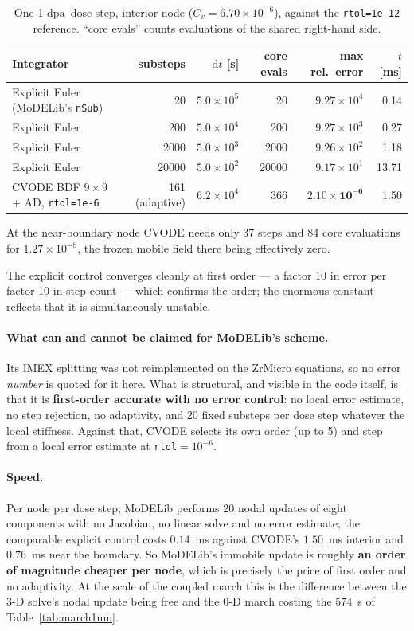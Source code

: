 \documentclass[11pt,a4paper]{article}
\newcommand{\code}[1]{\texttt{\small #1}}
\newcommand{\dpa}{\ensuremath{\mathrm{dpa}}}
\begin{document}
\begin{table}[htb]
\centering
\caption{One 1 \dpa\ dose step, interior node ($C_v=6.70\times10^{-6}$), against
the \code{rtol=1e-12} reference. ``core evals'' counts evaluations of the shared
right-hand side.}
\label{tab:eulerbdf}
\begin{tabular}{lrrrrr}
\toprule
Integrator & substeps & $\mathrm dt$ [s] & core evals & max rel.\ error & $t$ [ms] \\
\midrule
Explicit Euler (MoDELib's \code{nSub}) & 20    & $5.0\times10^{5}$ & 20    & $9.27\times10^{4}$ & 0.14 \\
Explicit Euler                          & 200   & $5.0\times10^{4}$ & 200   & $9.27\times10^{3}$ & 0.27 \\
Explicit Euler                          & 2000  & $5.0\times10^{3}$ & 2000  & $9.26\times10^{2}$ & 1.18 \\
Explicit Euler                          & 20000 & $5.0\times10^{2}$ & 20000 & $9.17\times10^{1}$ & 13.71 \\
\midrule
CVODE BDF $9\times9$ + AD, \code{rtol=1e-6} & 161 (adaptive) & $6.2\times10^{4}$ & 366 & $\mathbf{2.10\times10^{-6}}$ & 1.50 \\
\bottomrule
\end{tabular}
\end{table}

At the near-boundary node CVODE needs only 37 steps and 84 core evaluations for
$1.27\times10^{-8}$, the frozen mobile field there being effectively zero.

The explicit control converges cleanly at first order --- a factor 10 in error
per factor 10 in step count --- which confirms the order; the enormous constant
reflects that it is simultaneously unstable.

\paragraph{What can and cannot be claimed for MoDELib's scheme.} Its IMEX
splitting was not reimplemented on the ZrMicro equations, so no error
\emph{number} is quoted for it here. What is structural, and visible in the code
itself, is that it is \textbf{first-order accurate with no error control}: no
local error estimate, no step rejection, no adaptivity, and 20 fixed substeps per
dose step whatever the local stiffness. Against that, CVODE selects its own order
(up to 5) and step from a local error estimate at \code{rtol}$=10^{-6}$.

\paragraph{Speed.} Per node per dose step, MoDELib performs 20 nodal updates of
eight components with no Jacobian, no linear solve and no error estimate; the
comparable explicit control costs $0.14$~ms against CVODE's $1.50$~ms interior
and $0.76$~ms near the boundary. So MoDELib's immobile update is roughly
\textbf{an order of magnitude cheaper per node}, which is precisely the price of
first order and no adaptivity. At the scale of the coupled march this is the
difference between the 3-D solve's nodal update being free and the 0-D march
costing the $574$~s of Table~\ref{tab:march1um}.
\end{document}
